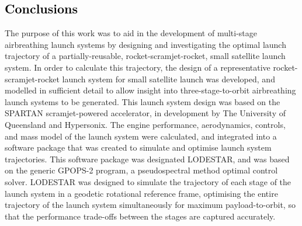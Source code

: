 
\cleardoublepage
\textcolor{black}{
\chapter{Conclusions}
}
\noindent
The purpose of this work was to aid in the development of multi-stage airbreathing launch systems by designing and investigating the optimal launch trajectory of a partially-reusable, rocket-scramjet-rocket, small satellite launch system. 
In order to calculate this trajectory, the design of a representative rocket-scramjet-rocket launch system for small satellite launch was developed, and modelled in sufficient detail to allow insight into three-stage-to-orbit airbreathing launch systems to be generated. This launch system design was based on the SPARTAN scramjet-powered accelerator, in development by The University of Queensland and Hypersonix. The engine performance, aerodynamics, controls, and mass model of the launch system were calculated, and integrated into a software package that was created to simulate and optimise launch system trajectories. This software package was designated LODESTAR, and was based on the generic GPOPS-2 program, a pseudospectral method optimal control solver. LODESTAR was designed to simulate the trajectory of each stage of the launch system in a geodetic rotational reference frame, optimising the entire trajectory of the launch system simultaneously for maximum payload-to-orbit, so that the performance trade-offs between the stages are captured accurately.

